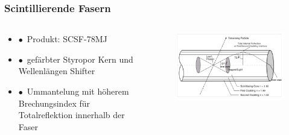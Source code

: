 \documentclass[aspectratio=1610, 12pt, xcolor=dvipsnames]{beamer}
\begin{document}
\begin{frame}\frametitle{Scintillierende Fasern}
  \begin{columns}
    \begin{column}[c]{0.48\textwidth}
      \begin{itemize}
        \item $\bullet$\, Produkt: SCSF-78MJ
        \item $\bullet$\, gefärbter Styropor Kern und Wellenlängen Shifter
        \item $\bullet$\, Ummantelung mit höherem Brechungsindex für Totalreflektion innerhalb der Faser
      \end{itemize}
    \end{column}
    \begin{column}[c]{0.48\textwidth}
      \begin{figure}
        \centering
        \includegraphics[width=\textwidth]{plots/giudance.png}
      \end{figure}
    \end{column}
  \end{columns}
\end{frame}
\end{document}
